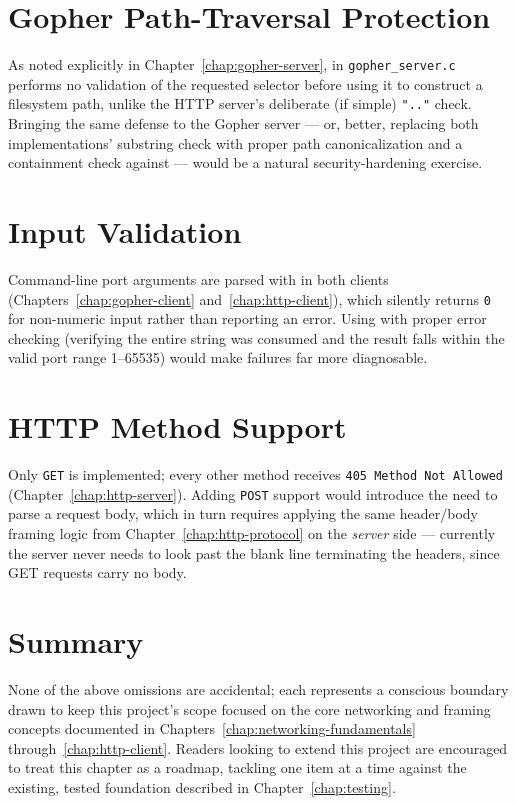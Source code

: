 \section{Gopher Path-Traversal Protection}

As noted explicitly in Chapter~\ref{chap:gopher-server},  in \texttt{gopher\_server.c} performs no validation of the requested selector before using it to construct a filesystem path, unlike the HTTP server's deliberate (if simple) \texttt{".."} check. Bringing the same defense to the Gopher server --- or, better, replacing both implementations' substring check with proper path canonicalization and a containment check against  --- would be a natural security-hardening exercise.

\section{Input Validation}

Command-line port arguments are parsed with  in both clients (Chapters~\ref{chap:gopher-client} and~\ref{chap:http-client}), which silently returns \texttt{0} for non-numeric input rather than reporting an error. Using  with proper error checking (verifying the entire string was consumed and the result falls within the valid port range 1--65535) would make failures far more diagnosable.

\section{HTTP Method Support}

Only \texttt{GET} is implemented; every other method receives \texttt{405 Method Not Allowed} (Chapter~\ref{chap:http-server}). Adding \texttt{POST} support would introduce the need to parse a request body, which in turn requires applying the same header/body framing logic from Chapter~\ref{chap:http-protocol} on the \emph{server} side --- currently the server never needs to look past the blank line terminating the headers, since GET requests carry no body.

\section{Summary}

None of the above omissions are accidental; each represents a conscious boundary drawn to keep this project's scope focused on the core networking and framing concepts documented in Chapters~\ref{chap:networking-fundamentals} through~\ref{chap:http-client}. Readers looking to extend this project are encouraged to treat this chapter as a roadmap, tackling one item at a time against the existing, tested foundation described in Chapter~\ref{chap:testing}.
